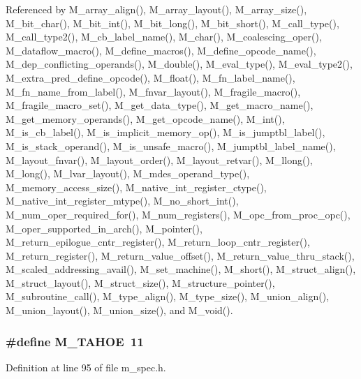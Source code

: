 Referenced by M\_\-array\_\-align(), M\_\-array\_\-layout(), M\_\-array\_\-size(), M\_\-bit\_\-char(), M\_\-bit\_\-int(), M\_\-bit\_\-long(), M\_\-bit\_\-short(), M\_\-call\_\-type(), M\_\-call\_\-type2(), M\_\-cb\_\-label\_\-name(), M\_\-char(), M\_\-coalescing\_\-oper(), M\_\-dataflow\_\-macro(), M\_\-define\_\-macros(), M\_\-define\_\-opcode\_\-name(), M\_\-dep\_\-conflicting\_\-operands(), M\_\-double(), M\_\-eval\_\-type(), M\_\-eval\_\-type2(), M\_\-extra\_\-pred\_\-define\_\-opcode(), M\_\-float(), M\_\-fn\_\-label\_\-name(), M\_\-fn\_\-name\_\-from\_\-label(), M\_\-fnvar\_\-layout(), M\_\-fragile\_\-macro(), M\_\-fragile\_\-macro\_\-set(), M\_\-get\_\-data\_\-type(), M\_\-get\_\-macro\_\-name(), M\_\-get\_\-memory\_\-operands(), M\_\-get\_\-opcode\_\-name(), M\_\-int(), M\_\-is\_\-cb\_\-label(), M\_\-is\_\-implicit\_\-memory\_\-op(), M\_\-is\_\-jumptbl\_\-label(), M\_\-is\_\-stack\_\-operand(), M\_\-is\_\-unsafe\_\-macro(), M\_\-jumptbl\_\-label\_\-name(), M\_\-layout\_\-fnvar(), M\_\-layout\_\-order(), M\_\-layout\_\-retvar(), M\_\-llong(), M\_\-long(), M\_\-lvar\_\-layout(), M\_\-mdes\_\-operand\_\-type(), M\_\-memory\_\-access\_\-size(), M\_\-native\_\-int\_\-register\_\-ctype(), M\_\-native\_\-int\_\-register\_\-mtype(), M\_\-no\_\-short\_\-int(), M\_\-num\_\-oper\_\-required\_\-for(), M\_\-num\_\-registers(), M\_\-opc\_\-from\_\-proc\_\-opc(), M\_\-oper\_\-supported\_\-in\_\-arch(), M\_\-pointer(), M\_\-return\_\-epilogue\_\-cntr\_\-register(), M\_\-return\_\-loop\_\-cntr\_\-register(), M\_\-return\_\-register(), M\_\-return\_\-value\_\-offset(), M\_\-return\_\-value\_\-thru\_\-stack(), M\_\-scaled\_\-addressing\_\-avail(), M\_\-set\_\-machine(), M\_\-short(), M\_\-struct\_\-align(), M\_\-struct\_\-layout(), M\_\-struct\_\-size(), M\_\-structure\_\-pointer(), M\_\-subroutine\_\-call(), M\_\-type\_\-align(), M\_\-type\_\-size(), M\_\-union\_\-align(), M\_\-union\_\-layout(), M\_\-union\_\-size(), and M\_\-void().
\subsubsection{\setlength{\rightskip}{0pt plus 5cm}\#define M\_\-TAHOE~11}\label{m__spec_8h_87ce108f22b58ab0e2e9408702ced941}




Definition at line 95 of file m\_\-spec.h.

